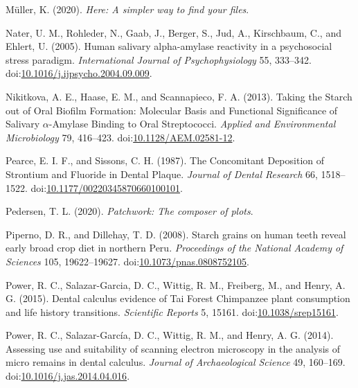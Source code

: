 \documentclass[utf8]{frontiers/frontiersSCNS}
\newlength{\cslhangindent}
\newlength{\cslentryspacingunit} %
\newenvironment{CSLReferences}[2] %
 {%
  \setlength{\parindent}{0pt}
  \ifodd #1
  \let\oldpar\par
  \def\par{\hangindent=\cslhangindent\oldpar}
  \fi
  \setlength{\parskip}{#2\cslentryspacingunit}
 }%
 {}
\begin{document}
\begin{CSLReferences}{1}{0}
\leavevmode{}%
Müller, K. (2020). \emph{Here: {A} simpler way to find your files}.

\leavevmode{}%
Nater, U. M., Rohleder, N., Gaab, J., Berger, S., Jud, A., Kirschbaum, C., and Ehlert, U. (2005). Human salivary alpha-amylase reactivity in a psychosocial stress paradigm. \emph{International Journal of Psychophysiology} 55, 333--342. doi:\href{https://doi.org/10.1016/j.ijpsycho.2004.09.009}{10.1016/j.ijpsycho.2004.09.009}.

\leavevmode{}%
Nikitkova, A. E., Haase, E. M., and Scannapieco, F. A. (2013). Taking the {Starch} out of {Oral Biofilm Formation}: {Molecular Basis} and {Functional Significance} of {Salivary} {\(\alpha\)}-{Amylase Binding} to {Oral Streptococci}. \emph{Applied and Environmental Microbiology} 79, 416--423. doi:\href{https://doi.org/10.1128/AEM.02581-12}{10.1128/AEM.02581-12}.

\leavevmode{}%
Pearce, E. I. F., and Sissons, C. H. (1987). The {Concomitant Deposition} of {Strontium} and {Fluoride} in {Dental Plaque}. \emph{Journal of Dental Research} 66, 1518--1522. doi:\href{https://doi.org/10.1177/00220345870660100101}{10.1177/00220345870660100101}.

\leavevmode{}%
Pedersen, T. L. (2020). \emph{Patchwork: {The} composer of plots}.

\leavevmode{}%
Piperno, D. R., and Dillehay, T. D. (2008). Starch grains on human teeth reveal early broad crop diet in northern {Peru}. \emph{Proceedings of the National Academy of Sciences} 105, 19622--19627. doi:\href{https://doi.org/10.1073/pnas.0808752105}{10.1073/pnas.0808752105}.

\leavevmode{}%
Power, R. C., Salazar-Garcia, D. C., Wittig, R. M., Freiberg, M., and Henry, A. G. (2015). Dental calculus evidence of {Tai Forest Chimpanzee} plant consumption and life history transitions. \emph{Scientific Reports} 5, 15161. doi:\href{https://doi.org/10.1038/srep15161}{10.1038/srep15161}.

\leavevmode{}%
Power, R. C., Salazar-García, D. C., Wittig, R. M., and Henry, A. G. (2014). Assessing use and suitability of scanning electron microscopy in the analysis of micro remains in dental calculus. \emph{Journal of Archaeological Science} 49, 160--169. doi:\href{https://doi.org/10.1016/j.jas.2014.04.016}{10.1016/j.jas.2014.04.016}.


\end{CSLReferences}
\end{document}
